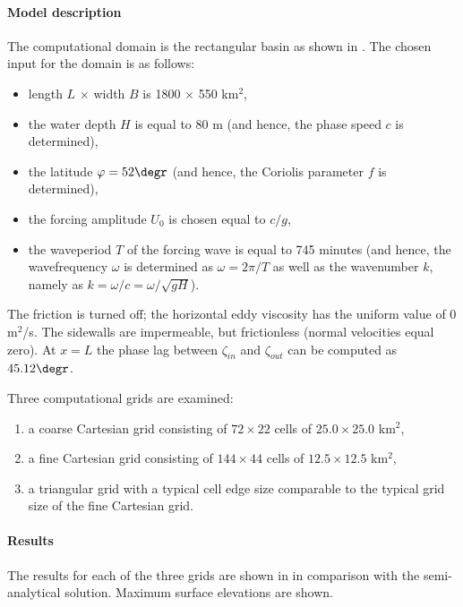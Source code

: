 \paragraph*{Model description}
The computational domain is the rectangular basin as shown in . The chosen input for the domain is as follows:
\begin{itemize}
\item length $L$ $\times$ width $B$ is 1800 $\times$ 550 km$^2$,
\item the water depth $H$ is equal to 80 m (and hence, the phase speed $c$ is determined),
\item the latitude $\varphi = 52 \degr$ (and hence, the Coriolis parameter $f$ is determined),
\item the forcing amplitude $U_0$ is chosen equal to $c/g$,
\item the waveperiod $T$ of the forcing wave is equal to 745 minutes (and hence, the wavefrequency $\omega$ is determined as $\omega = 2\pi/T$ as well as the wavenumber $k$, namely as $k= \omega / c = \omega / \sqrt{gH}$).
\end{itemize}
The friction is turned off; the horizontal eddy viscosity has the uniform value of 0 m$^2$/s. The sidewalls are impermeable, but frictionless (normal velocities equal zero). At $x = L$ the phase lag between $\zeta_{in}$ and $\zeta_{out}$ can be computed as $45.12\degr$.

Three computational grids are examined: 
\begin{enumerate}
\item a coarse Cartesian grid consisting of $72 \times 22$ cells of $25.0 \times 25.0$ km$^2$,
\item a fine Cartesian grid consisting of $144 \times 44$ cells of $12.5 \times 12.5$ km$^2$,
\item a triangular grid with a typical cell edge size comparable to the typical grid size of the fine Cartesian grid.
\end{enumerate}


\paragraph*{Results}
The results for each of the three grids are shown in  in comparison with the semi-analytical solution. Maximum surface elevations are shown.

